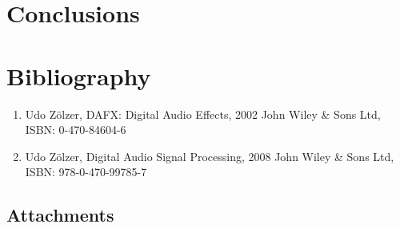 \documentclass[a4paper,twoside,12pt]{book}
\begin{document}
\newpage



\chapter{Conclusions}

\newpage



\chapter{Bibliography}
\begin{enumerate}
    \item Udo Zölzer, DAFX: Digital Audio Effects, 2002 John Wiley \& Sons Ltd, ISBN: 0-470-84604-6
    \item Udo Zölzer, Digital Audio Signal Processing, 2008 John Wiley \& Sons Ltd, ISBN: 978-0-470-99785-7
\end{enumerate}
\newpage



\section{Attachments}

\newpage
\end{document}
